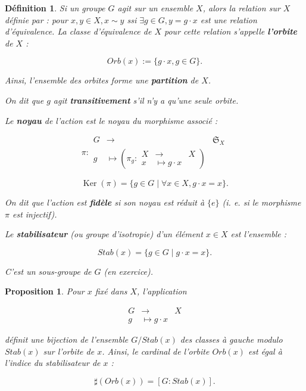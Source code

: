 \documentclass[french]{book}
\newtheorem{prop}{Proposition}[section]
\newtheorem{definition}{Définition}[section]
\begin{document}
\begin{definition}
  Si un groupe $G$ agit sur un ensemble $X$, alors la relation sur $X$ définie par : pour $x, y \in X, x \sim y $ ssi $\exists g \in G, y = g  \cdot x$ est une relation d'équivalence. La classe d'équivalence de $X$ pour cette relation s'appelle \textbf{l'orbite} de $X$ :

  \[
  Orb(x):= \{ g \cdot x, g \in G \} .
  \]

  Ainsi, l'ensemble des orbites forme une \textbf{partition} de $X$.

  On dit que $g$ agit \textbf{transitivement} s'il n'y a qu'une seule orbite.

  Le \textbf{noyau} de l'action est le noyau du morphisme associé :

  \[
  \pi:
    \begin{array}{rcl}
    G & \longrightarrow & \mathfrak{S}_{X}  \\
    g & \longmapsto \left(\pi_g:
      \begin{array}{rcl}
      X & \longrightarrow & X \\
      x & \longmapsto g \cdot x
      \end{array}\right)
    \end{array}
  \]

  \[
  \operatorname{Ker}(\pi) = \{ g \in G \mid \forall x \in X, g \cdot x = x \}.
  \]

  On dit que l'action est \textbf{fidèle} si son noyau est réduit à $\{ e \} $ (i. e. si le morphisme $\pi$ est injectif).

  Le \textbf{stabilisateur} (ou groupe d'isotropie) d'un élément $x \in X$ est l'ensemble :

  \[
  Stab(x) = \{ g \in G \mid g \cdot x = x \}.
  \]

  C'est un sous-groupe de $G$ (en exercice).
\end{definition}

\begin{prop}
  Pour $x$ fixé dans $X$, l'application

  \[
    \begin{array}{rcl}
    G & \longrightarrow & X \\
    g & \longmapsto g \cdot x
    \end{array}
  \]

  définit une bijection de l'ensemble $G / Stab(x)$ des classes à gauche modulo $Stab(x)$ sur l'orbite de $x$. Ainsi, le cardinal de l'orbite $Orb(x)$ est égal à l'indice du stabilisateur de $x$ :

  \[
  \sharp(Orb(x)) = [G:Stab(x)].
  \]
\end{prop}
\end{document}
